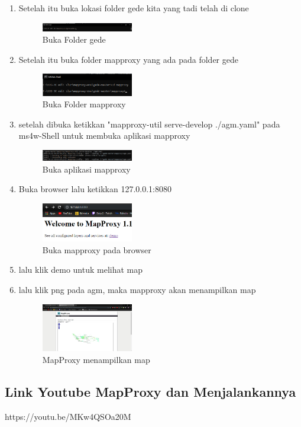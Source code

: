 \begin{enumerate}
  \item Setelah itu buka lokasi folder gede kita yang tadi telah di clone
  \hfill\break
  \begin{figure}[H]
  \includegraphics[width=4cm]{figures/Tugas4/1174083/pic17.png}
  \centering
  \caption{Buka Folder gede}
  \end{figure}

  \item Setelah itu buka folder mapproxy yang ada pada folder gede
  \hfill\break
  \begin{figure}[H]
  \includegraphics[width=4cm]{figures/Tugas4/1174083/pic18.png}
  \centering
  \caption{Buka Folder mapproxy}
  \end{figure}

  \item setelah dibuka ketikkan "mapproxy-util serve-develop ./agm.yaml" pada ms4w-Shell untuk membuka aplikasi mapproxy
  \hfill\break
  \begin{figure}[H]
  \includegraphics[width=4cm]{figures/Tugas4/1174083/pic19.png}
  \centering
  \caption{Buka aplikasi mapproxy}
  \end{figure}
  
  \item Buka browser lalu ketikkan 127.0.0.1:8080
  \hfill\break
  \begin{figure}[H]
  \includegraphics[width=4cm]{figures/Tugas4/1174083/pic20.png}
  \centering
  \caption{Buka mapproxy pada browser}
  \end{figure}

  \item lalu klik demo untuk melihat map
  \item lalu klik png pada agm, maka mapproxy akan menampilkan map
  \hfill\break
  \begin{figure}[H]
  \includegraphics[width=4cm]{figures/Tugas4/1174083/pic22.png}
  \centering
  \caption{MapProxy menampilkan map}
  \end{figure}

\end{enumerate}

\subsection{Link Youtube MapProxy dan Menjalankannya}
https://youtu.be/MKw4QSOa20M
